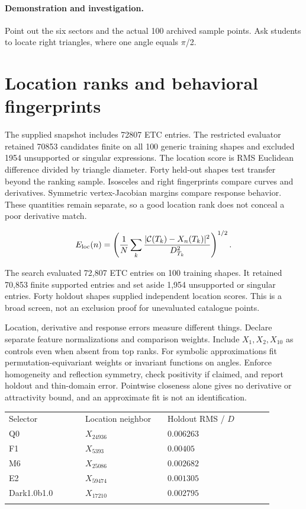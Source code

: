 \documentclass[11pt,oneside,openany]{book}
\newcommand{\toprule}{\hline\noalign{\vskip4pt}}
\newcommand{\midrule}{\noalign{\vskip3pt}\hline\noalign{\vskip4pt}}
\newcommand{\bottomrule}{\noalign{\vskip3pt}\hline}
\newcommand{\TC}{\mathcal C}\newcommand{\mean}{\operatorname{mean}}
\begin{document}
\paragraph{Demonstration and investigation.} Point out the six sectors and the actual 100 archived sample points. Ask students to locate right triangles, where one angle equals \ensuremath{\pi}/2.


\section{Location ranks and behavioral fingerprints}\label{sec:slide72}

The supplied snapshot includes 72807 ETC entries. The restricted evaluator retained 70853 candidates finite on all 100 generic training shapes and excluded 1954 unsupported or singular expressions. The location score is RMS Euclidean difference divided by triangle diameter. Forty held-out shapes test transfer beyond the ranking sample. Isosceles and right fingerprints compare curves and derivatives. Symmetric vertex-Jacobian margins compare response behavior. These quantities remain separate, so a good location rank does not conceal a poor derivative match.


\[E_{\rm loc}(n)=\left(\frac1N\sum_k\frac{|\TC(T_k)-X_n(T_k)|^2}{D_{T_k}^2}\right)^{1/2}.\]



The search evaluated 72,807 ETC entries on 100 training shapes.
It retained 70,853 finite supported entries and set aside 1,954
unsupported or singular entries. Forty holdout shapes supplied
independent location scores. This is a broad screen, not an
exclusion proof for unevaluated catalogue points.

Location, derivative and response errors measure different things.
Declare separate feature normalizations and comparison weights.
Include $X_1,X_2,X_{10}$ as controls even when absent from top ranks.
For symbolic approximations fit permutation-equivariant weights or
invariant functions on angles. Enforce homogeneity and reflection
symmetry, check positivity if claimed, and report holdout and
thin-domain error. Pointwise closeness alone gives no derivative
or attractivity bound, and an approximate fit is not an identification.



\begin{center}\small\begin{tabular}{p{0.26\linewidth}p{0.28\linewidth}p{0.36\linewidth}}\toprule
Selector & Location neighbor & Holdout RMS / $D$\\\midrule
$\mathrm{Q0}$ & $X_{24936}$ & \(0.006263\)\\
F1 & $X_{5393}$ & \(0.00405\)\\
M6 & $X_{25086}$ & \(0.002682\)\\
E2 & $X_{59474}$ & \(0.001305\)\\
Dark1.0b1.0 & $X_{17210}$ & \(0.002795\)\\\bottomrule\end{tabular}\end{center}
\end{document}
